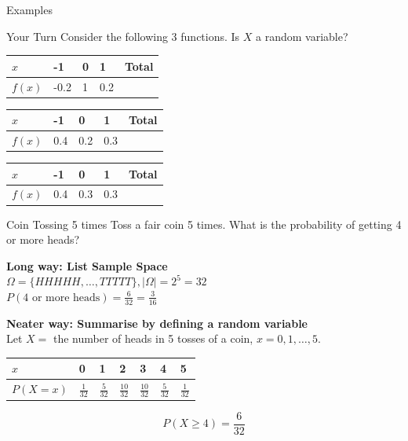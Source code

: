 \documentclass[t,xcolor=pdftex,dvipsnames,table]{beamer}
\begin{document}
\begin{frame}[fragile]{Examples}
\begin{alertblock}{Your Turn}
Consider the following 3 functions. Is $X$ a random variable?

\begin{center}
\begin{tabular}{|l|l|l|l|l|} \hline
$x$ & -1 & 0 & 1 & Total \\ \hline
$f(x)$ & -0.2 & 1 & 0.2 & \\ \hline
\end{tabular}
\end{center}

\begin{center}
\begin{tabular}{|l|l|l|l|l|} \hline
$x$ & -1 & 0 & 1 & Total \\ \hline
$f(x)$ & 0.4 & 0.2 & 0.3 & \\ \hline
\end{tabular}
\end{center}

\begin{center}
\begin{tabular}{|l|l|l|l|l|} \hline
$x$ & -1 & 0 & 1 & Total \\ \hline
$f(x)$ & 0.4 & 0.3 & 0.3 & \\ \hline
\end{tabular}
\end{center}
\end{alertblock}
\end{frame}

\begin{frame}{}
\begin{block}{Coin Tossing 5 times}
Toss a fair coin 5 times. What is the probability of getting 4 or more heads?

\vspace{.5cm}
{\bf Long way: List Sample Space}  \\
$ \Omega = 
\{  HHHHH, \ldots, TTTTT\} , |\Omega| = 2^5 = 32$ \\
$ P( \mbox{4 or more heads})  =  \frac{6}{32} = \frac{3}{16}$ 

\vspace{.5cm}
{\bf Neater way: Summarise by defining a random variable} \\
Let $X = $ the number of heads in 5 tosses of a coin, $x=0,1,\ldots,5$.

\begin{center}
\begin{tabular}{|l|l|l|l|l|l|l|} \hline
$x$ & 0 & 1 & 2 & 3 & 4 & 5  \\ \hline
$P(X=x)$ & $\frac{1}{32}$ & $\frac{5}{32}$ & $\frac{10}{32}$ & $\frac{10}{32}$ & $\frac{5}{32}$ & $\frac{1}{32}$  \\ \hline
\end{tabular}
\end{center}

\[P( X \geq 4)  =  \frac{6}{32}   \]

\end{block}
\end{frame}
\end{document}
